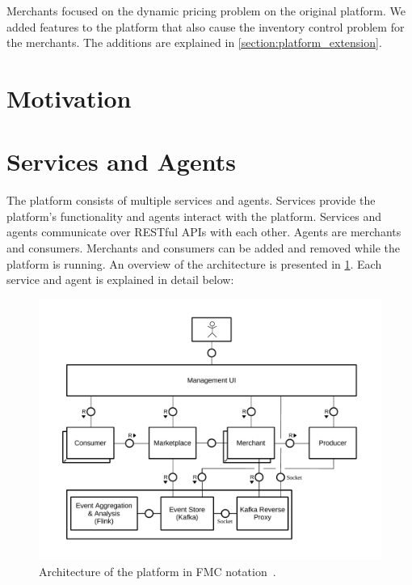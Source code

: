 Merchants focused on the dynamic pricing problem on the original \pricewars platform.
We added features to the platform that also cause the inventory control problem for the merchants.
The additions are explained in \cref{section:platform_extension}. 

\section{Motivation}
\todo{}

\section{Services and Agents}
The \pricewars platform consists of multiple services and agents.
Services provide the platform's functionality and agents interact with the platform.
Services and agents communicate over RESTful APIs with each other.
Agents are merchants and consumers.
Merchants and consumers can be added and removed while the platform is running.
An overview of the architecture is presented in \cref{fig:platform_architecture}.
Each service and agent is explained in detail below:

\begin{figure}[t]
	\centering
	\includegraphics[width=\textwidth]{figures/pricewars-architecture}
	\caption[\pricewars Architecture]
	{Architecture of the \pricewars platform in FMC notation~\cite{knopfel2005fundamental}.}
	\label{fig:platform_architecture}
\end{figure}


